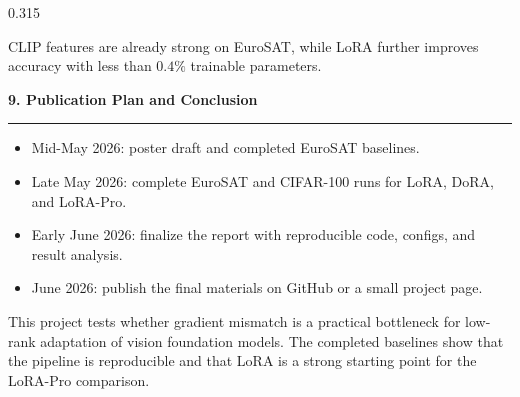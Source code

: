 \documentclass[final]{beamer}
\newcommand{\sectiontitle}[1]{%
  \vspace{0.45em}%
  {\Large\bfseries\color{titleblue}#1}\par
  \vspace{0.10em}%
  {\color{rulegray}\rule{\linewidth}{0.9pt}}\par
  \vspace{0.22em}%
}
\begin{document}
\begin{frame}[t]
\begin{columns}[t,totalwidth=\textwidth]
\begin{column}{0.315\textwidth}
\begin{center}
\end{center}

{\small
CLIP features are already strong on EuroSAT, while LoRA further improves
accuracy with less than \(0.4\%\) trainable parameters.
}

\sectiontitle{9. Publication Plan and Conclusion}
\begin{itemize}
  \item Mid-May 2026: poster draft and completed EuroSAT baselines.
  \item Late May 2026: complete EuroSAT and CIFAR-100 runs for LoRA, DoRA, and LoRA-Pro.
  \item Early June 2026: finalize the report with reproducible code, configs, and result analysis.
  \item June 2026: publish the final materials on GitHub or a small project page.
\end{itemize}

This project tests whether gradient mismatch is a practical bottleneck for
low-rank adaptation of vision foundation models. The completed baselines show
that the pipeline is reproducible and that LoRA is a strong starting point for
the LoRA-Pro comparison.

\end{column}

\end{columns}

\end{frame}
\end{document}
